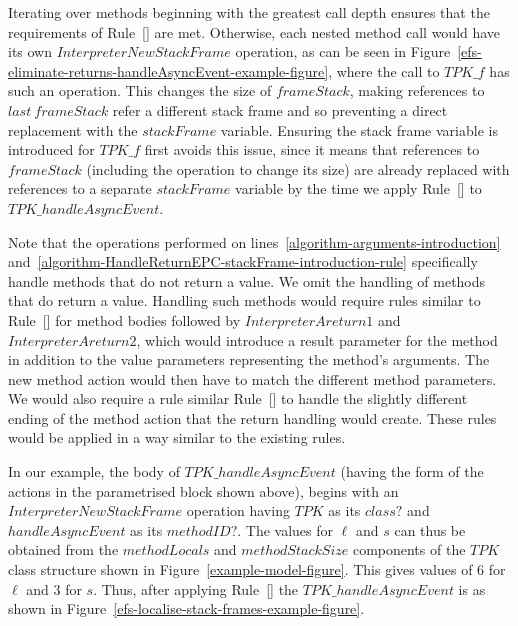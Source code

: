 Iterating over methods beginning with the greatest call depth ensures
that the requirements of
Rule~[] are met.
Otherwise, each nested method call would have its own
$InterpreterNewStackFrame$ operation, as can be seen in
Figure~\ref{efs-eliminate-returns-handleAsyncEvent-example-figure},
where the call to $TPK\_f$ has such an operation.
This changes the size of $frameStack$, making references to
$last~frameStack$ refer a different stack frame and so preventing a
direct replacement with the $stackFrame$ variable.
Ensuring the stack frame variable is introduced for $TPK\_f$ first
avoids this issue, since it means that references to $frameStack$
(including the operation to change its size) are already replaced with
references to a separate $stackFrame$ variable by the time we apply
Rule~[] to
$TPK\_handleAsyncEvent$.

Note that the operations performed on
lines~\ref{algorithm-arguments-introduction}
and~\ref{algorithm-HandleReturnEPC-stackFrame-introduction-rule}
specifically handle methods that do not return a value.
We omit the handling of methods that do return a value. 
Handling such methods would require rules similar to
Rule~[] for method bodies
followed by $InterpreterAreturn1$ and $InterpreterAreturn2$, which
would introduce a result parameter for the method in addition to the
value parameters representing the method's arguments.
The new method action would then have to match the different method
parameters.
We would also require a rule similar
Rule~[] to
handle the slightly different ending of the method action that the
return handling would create.
These rules would be applied in a way similar to the existing rules.

In our example, the body of $TPK\_handleAsyncEvent$ (having the form
of the actions in the parametrised block shown above), begins with an
$InterpreterNewStackFrame$ operation having $TPK$ as its $class?$ and
$handleAsyncEvent$ as its $methodID?$.
The values for $\ell$ and $s$ can thus be obtained from the
$methodLocals$ and $methodStackSize$ components of the $TPK$ class
structure shown in Figure~\ref{example-model-figure}.
This gives values of $6$ for $\ell$ and $3$ for $s$.
Thus, after applying
Rule~[] the
$TPK\_handleAsyncEvent$ is as shown in
Figure~\ref{efs-localise-stack-frames-example-figure}.

